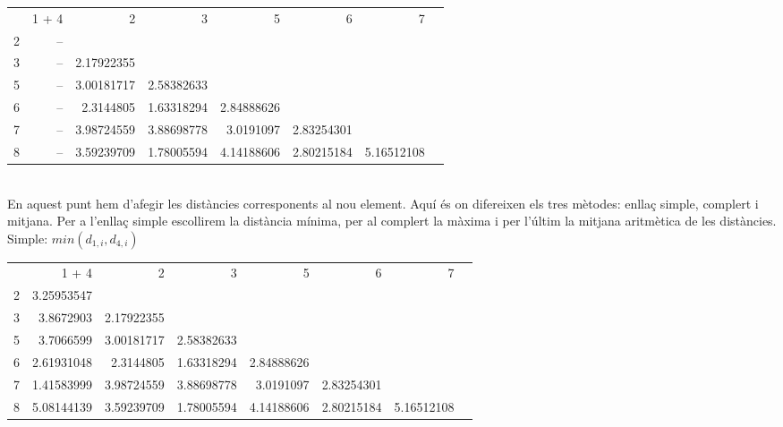 \documentclass{article} %
\begin{document}
{	{\selectfont\small
	\begin{tabular}{r r r r r r r r}
		  & 1 + 4      & 2          & 3          & 5          & 6          & 7          \\
		2 &         -- &            &            &            &            &            \\
		3 &         -- & 2.17922355 &            &            &            &            \\
		5 &         -- & 3.00181717 & 2.58382633 &            &            &            \\
		6 &         -- & 2.3144805  & 1.63318294 & 2.84888626 &            &            \\
		7 &         -- & 3.98724559 & 3.88698778 & 3.0191097  & 2.83254301 &            \\
		8 &         -- & 3.59239709 & 1.78005594 & 4.14188606 & 2.80215184 & 5.16512108 \\
	\end{tabular}
	} \\

	En aquest punt hem d’afegir les distàncies corresponents al nou element. Aquí és on difereixen els tres mètodes: enllaç simple, complert i mitjana. Per a l’enllaç simple escollirem la distància mínima, per al complert la màxima i per l’últim la mitjana aritmètica de les distàncies. \\

	Simple: \(min(d_{1,i}, d_{4,i})\)


	{\selectfont\small
	\begin{tabular}{r r r r r r r r}
		  & 1 + 4      & 2          & 3          & 5          & 6          & 7          \\
		2 & 3.25953547 &            &            &            &            &            \\
		3 & 3.8672903 & 2.17922355 &            &            &            &            \\
		5 & 3.7066599 & 3.00181717 & 2.58382633 &            &            &            \\
		6 & 2.61931048 & 2.3144805  & 1.63318294 & 2.84888626 &            &            \\
		7 & 1.41583999 & 3.98724559 & 3.88698778 & 3.0191097  & 2.83254301 &            \\
		8 & 5.08144139 & 3.59239709 & 1.78005594 & 4.14188606 & 2.80215184 & 5.16512108 \\
	\end{tabular}
	} \\

}
\end{document}
